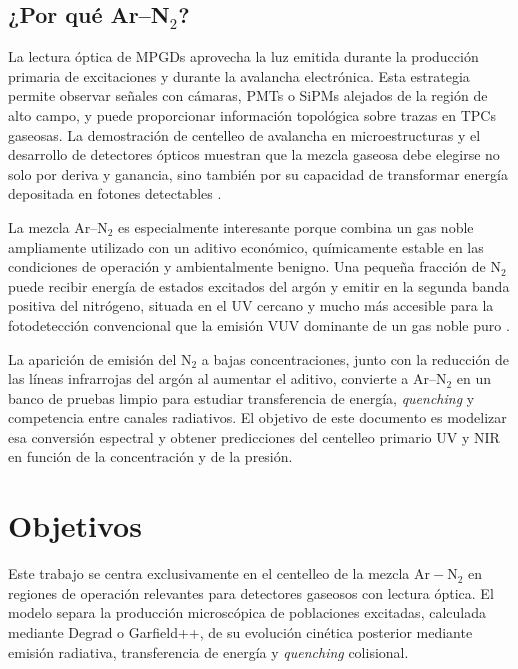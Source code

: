 \documentclass[12pt,a4paper]{article}
\newcommand{\N}{\mathrm{N}}
\newcommand{\Ar}{\mathrm{Ar}}
\begin{document}
\subsection{¿Por qué Ar--N$_2$?}

La lectura óptica de MPGDs aprovecha la luz emitida durante la producción primaria de excitaciones y durante la avalancha electrónica. Esta estrategia permite observar señales con cámaras, PMTs o SiPMs alejados de la región de alto campo, y puede proporcionar información topológica sobre trazas en TPCs gaseosas. La demostración de centelleo de avalancha en microestructuras y el desarrollo de detectores ópticos muestran que la mezcla gaseosa debe elegirse no solo por deriva y ganancia, sino también por su capacidad de transformar energía depositada en fotones detectables \cite{bondara2010direct,oliveira2012simulation,torelli2022the,williams2024fatgems}.

La mezcla Ar--N$_2$ es especialmente interesante porque combina un gas noble ampliamente utilizado con un aditivo económico, químicamente estable en las condiciones de operación y ambientalmente benigno. Una pequeña fracción de N$_2$ puede recibir energía de estados excitados del argón y emitir en la segunda banda positiva del nitrógeno, situada en el UV cercano y mucho más accesible para la fotodetección convencional que la emisión VUV dominante de un gas noble puro \cite{puech1977energy,morii2004quenching,friedl2012spectral}.

La aparición de emisión del N$_2$ a bajas concentraciones, junto con la reducción de las líneas infrarrojas del argón al aumentar el aditivo, convierte a Ar--N$_2$ en un banco de pruebas limpio para estudiar transferencia de energía, \emph{quenching} y competencia entre canales radiativos. El objetivo de este documento es modelizar esa conversión espectral y obtener predicciones del centelleo primario UV y NIR en función de la concentración y de la presión.


\section{Objetivos}

Este trabajo se centra exclusivamente en el centelleo de la mezcla $\Ar-\N_2$ en regiones de operación relevantes para detectores gaseosos con lectura óptica. El modelo separa la producción microscópica de poblaciones excitadas, calculada mediante Degrad o Garfield++, de su evolución cinética posterior mediante emisión radiativa, transferencia de energía y \emph{quenching} colisional.
\end{document}
